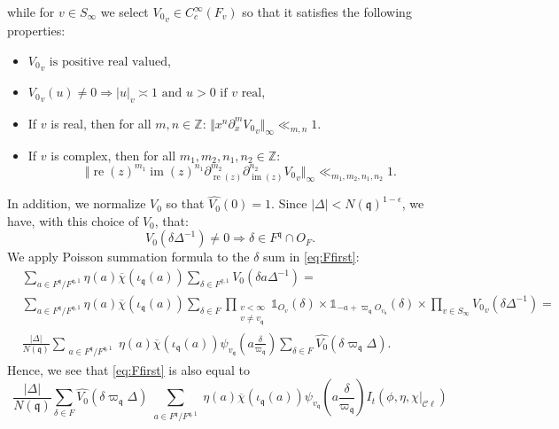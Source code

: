 \documentclass[a4paper,11pt]{amsart}
\theoremstyle{definition}
\newcommand{\Z}{\mathbb{Z}}
\newcommand{\cl}{\mathcal{C}\ell}
\newcommand{\imag}{\operatorname{im}}
\newcommand{\real}{\operatorname{re}}
\begin{document}
   while for $v\in S_{\infty}$ we select ${V_0}_v\in C_c^{\infty}(F_v)$ so that it satisfies the following properties:
   \begin{itemize}\item ${V_0}_v \text{ is positive real valued}$,
   \item $
   {V_0}_v(u)\neq 0 \Rightarrow \vert{u}\vert_v \asymp 1 \text{ and } u>0 \text{ if } v \text{ real}$,
   \item If $v$ is real, then for all $m,n \in \Z$: $\Vert{x^n\partial_x^m{V_0}_v}\Vert_{\infty}\ll_{m,n} 1$.
   \item If $v$ is complex, then for all $m_1,m_2,n_1,n_2 \in \Z$: $$\Vert{\real(z)^{m_1}\imag(z)^{n_1}\partial_{\real(z)}^{m_2}\partial^{n_2}_{\imag(z)}{V_0}_v}\Vert_\infty\ll_{m_1,m_2,n_1,n_2} 1.$$
   \end{itemize}
   In addition, we normalize $V_0$ so that $\widehat{V_0}(0) = 1$. Since $\vert{\Delta}\vert < N(\mathfrak{q})^{1-\epsilon}$, we have, with this choice of $V_0$, that: \[V_0(\delta\Delta^{-1})\neq0 \Rightarrow \delta \in F^{\mathfrak{q}}\cap O_F. \] 
    We apply Poisson summation formula to the $\delta$ sum in \eqref{eq:Ffirst}:
\begin{align*}
    &\sum_{a \in F^{\mathfrak{q}}/F^{\mathfrak{q},1}}\eta(a)\overline{\chi}(\iota_{\mathfrak{q}}(a))\sum_{\delta \in F^{q,1}}V_0(\delta a\Delta^{-1}) \nonumber=\\&\sum_{a\in F^{\mathfrak{q}}/F^{\mathfrak{q},1}}\eta(a)\overline{\chi}(\iota_{\mathfrak{q}}(a))\sum_{\delta \in F}\prod_{\substack{v<\infty\\v\neq v_{\mathfrak{q}}}}\mathbb{1}_{O_v}(\delta)\times \mathbb{1}_{-a+\varpi_{\mathfrak{q}}O_{v_\mathfrak{q}}}(\delta)\times \prod_{v\in S_{\infty}}{V_0}_v(\delta \Delta^{-1})
    \nonumber=\\ &\frac{\vert{\Delta}\vert}{N(\mathfrak{q})}\sum_{\substack{a\in F^{\mathfrak{q}}/F^{\mathfrak{q},1}}}\eta(a)\overline{\chi}(\iota_{\mathfrak{q}}(a))\psi_{v_{\mathfrak{q}}}\left(a\frac{\delta }{\varpi_{\mathfrak{q}}}\right)\sum_{\delta \in F}\widehat{V_0}\left(\delta\varpi_{\mathfrak{q}}  \Delta \right).
\end{align*}
Hence, we see that \eqref{eq:Ffirst} is also equal to 
\begin{equation}\label{eq:dualF}
\frac{\vert{\Delta}\vert}{N(\mathfrak{q})}\sum_{\delta \in F}\widehat{V_0}\left(\delta  \varpi_{\mathfrak{q}}\Delta\right)\sum_{\substack{a\in F^{\mathfrak{q}}/F^{\mathfrak{q},1}}}\eta(a)\overline{\chi}(\iota_{\mathfrak{q}}(a))\psi_{v_{\mathfrak{q}}}\left(a\frac{\delta }{\varpi_{\mathfrak{q}}}\right)I_t(\phi,\eta,\chi|_{\cl})
\end{equation}
\end{document}
